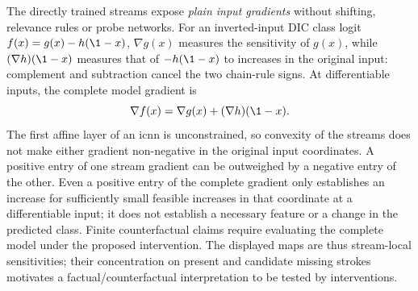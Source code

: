 The directly trained streams expose \emph{plain input gradients} without shifting, relevance rules or probe networks. For an inverted-input DIC class logit $f(x)=g(x)-h(\1-x)$, $\nabla g(x)$ measures the sensitivity of $g(x)$, while $(\nabla h)(\1-x)$ measures that of $-h(\1-x)$ to increases in the original input: complement and subtraction cancel the two chain-rule signs. At differentiable inputs, the complete model gradient is
\begin{equation*}
	\nabla f(x)=\nabla g(x)+(\nabla h)(\1-x).
\end{equation*}
The first affine layer of an \ac{icnn} is unconstrained, so convexity of the streams does not make either gradient non-negative in the original input coordinates. A positive entry of one stream gradient can be outweighed by a negative entry of the other. Even a positive entry of the complete gradient only establishes an increase for sufficiently small feasible increases in that coordinate at a differentiable input; it does not establish a necessary feature or a change in the predicted class. Finite counterfactual claims require evaluating the complete model under the proposed intervention. The displayed maps are thus stream-local sensitivities; their concentration on present and candidate missing strokes motivates a factual/counterfactual interpretation to be tested by interventions.

